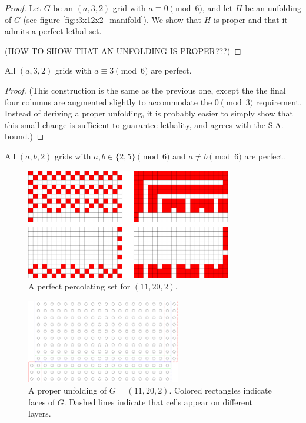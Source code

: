 \begin{proof}
Let $G$ be an $(a,3,2)$ grid with $a \equiv 0 \pmod 6$, and let $H$ be an unfolding of $G$ (see figure \ref{fig::3x12x2_manifold}). We show that $H$ is proper and that it admits a perfect lethal set. 

(HOW TO SHOW THAT AN UNFOLDING IS PROPER???)


\end{proof}

\begin{con}
All $(a,3,2)$ grids with $a \equiv 3 \pmod 6$ are perfect. 
\end{con}

\begin{proof}
(This construction is the same as the previous one, except the the final four columns are augmented slightly to accommodate the $0 \pmod 3$ requirement. Instead of deriving a proper unfolding, it is probably easier to simply show that this small change is sufficient to guarantee lethality, and agrees with the S.A. bound.)
\end{proof}


\begin{con}
All $(a,b,2)$ grids with $a,b \in \{2,5\} \pmod 6$ and $a \neq b \pmod 6$ are perfect. 
\end{con}

\begin{figure}[]
\centering
\includegraphics[width=0.8\textwidth]{figures/4/11x20x2.pdf}
\caption{A perfect percolating set for $(11,20,2)$.}
\label{fig:11x20x2}
\end{figure} 

\begin{figure}[]
\centering
\includegraphics[width=0.6\textwidth]{figures/4/11x20x2_manifold.pdf}
\caption{A proper unfolding of $G= (11,20,2)$. Colored rectangles indicate faces of $G$. Dashed lines indicate that cells appear on different layers. }
\label{fig:11x20x2_manifold}
\end{figure} 

